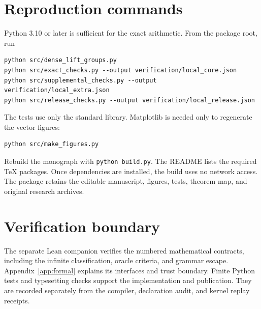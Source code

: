 \section{Reproduction commands}
Python 3.10 or later is sufficient for the exact arithmetic. From the package root, run
\begin{lstlisting}
python src/dense_lift_groups.py
python src/exact_checks.py --output verification/local_core.json
python src/supplemental_checks.py --output verification/local_extra.json
python src/release_checks.py --output verification/local_release.json
\end{lstlisting}
The tests use only the standard library. Matplotlib is needed only to regenerate the vector figures:
\begin{lstlisting}
python src/make_figures.py
\end{lstlisting}
Rebuild the monograph with \texttt{python build.py}. The README lists the required TeX packages. Once dependencies are installed, the build uses no network access. The package retains the editable manuscript, figures, tests, theorem map, and original research archives.

\section{Verification boundary}
The separate Lean companion verifies the numbered mathematical contracts, including the infinite classification, oracle criteria, and grammar escape. Appendix~\ref{app:formal} explains its interfaces and trust boundary. Finite Python tests and typesetting checks support the implementation and publication. They are recorded separately from the compiler, declaration audit, and kernel replay receipts.
